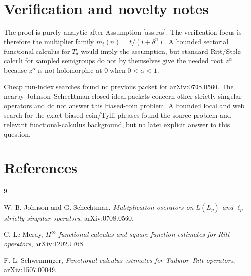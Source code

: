 \documentclass[11pt]{article}
\begin{document}
\section*{Verification and novelty notes}

The proof is purely analytic after Assumption \ref{ass:res}. The verification
focus is therefore the multiplier family \(m_t(n)=t/(t+\delta^n)\). A bounded
sectorial functional calculus for \(T_\delta\) would imply the assumption, but
standard Ritt/Stolz calculi for sampled semigroups do not by themselves give
the needed root \(z^\alpha\), because \(z^\alpha\) is not holomorphic at
\(0\) when \(0<\alpha<1\).

Cheap run-index searches found no previous packet for arXiv:0708.0560. The
nearby Johnson--Schechtman closed-ideal packets concern other strictly
singular operators and do not answer this biased-coin problem. A bounded
local and web search for the exact biased-coin/Tylli phrases found the source
problem and relevant functional-calculus background, but no later explicit
answer to this question.

\section*{References}

\begin{thebibliography}{9}

W. B. Johnson and G. Schechtman,
\emph{Multiplication operators on \(L(L_p)\) and \(\ell_p\)-strictly singular
operators}, arXiv:0708.0560.

C. Le Merdy,
\emph{\(H^\infty\) functional calculus and square function estimates for
Ritt operators}, arXiv:1202.0768.

F. L. Schwenninger,
\emph{Functional calculus estimates for Tadmor--Ritt operators},
arXiv:1507.00049.

\end{thebibliography}
\end{document}
